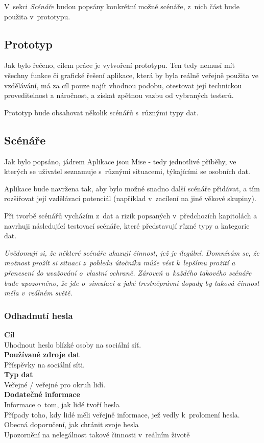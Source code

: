 V~sekci \textit{Scénáře} budou popsány konkrétní možné scénáře, z~nich část bude použita v~prototypu.

\subsection{Prototyp}
Jak bylo řečeno, cílem práce je vytvoření prototypu. Ten tedy nemusí mít všechny funkce či grafické řešení aplikace, která by byla reálně veřejně použita ve vzdělávání, má za cíl pouze najít vhodnou podobu, otestovat její technickou proveditelnost a náročnost, a získat zpětnou vazbu od vybraných testerů.

Prototyp bude obsahovat několik scénářů s~různými typy dat.


\subsection{Scénáře}
Jak bylo popsáno, jádrem Aplikace jsou Mise - tedy jednotlivé příběhy, ve kterých se uživatel seznamuje s~různými situacemi, týkajícími se osobních dat.

Aplikace bude navržena tak, aby bylo možné snadno další scénáře přidávat, a tím rozšiřovat její vzdělávací potenciál (například v~zacílení na jiné věkové skupiny).

Při tvorbě scénářů vycházím z~dat a rizik popsaných v~předchozích kapitolách a navrhuji následující testovací scénáře, které představují různé typy a kategorie dat.

\textit{Uvědomuji si, že některé scénáře ukazují činnost, jež je ilegální. Domnívám se, že možnost prožít si situaci z~pohledu útočníka může vést k~lepšímu prožití a přenesení do uvažování o~vlastní ochraně. Zároveň u~každého takového scénáře bude upozorněno, že jde o~simulaci a jaké trestněprávní dopady by taková činnost měla v~reálném světě.}

\subsubsection*{Odhadnutí hesla}
\textbf{Cíl}\\
Uhodnout heslo blízké osoby na sociální síť.\\
\textbf{Používané zdroje dat}\\
Příspěvky na sociální síti.\\
\textbf{Typ dat}\\
Veřejné / veřejné pro okruh lidí.\\
\textbf{Dodatečné informace}\\
Informace o~tom, jak lidé tvoří hesla\\
Případy toho, kdy lidé měli veřejně informace, jež vedly k~prolomení hesla.\\
Obecná doporučení, jak chránit svoje hesla\\
Upozornění na nelegálnost takové činnosti v~reálním životě\\

